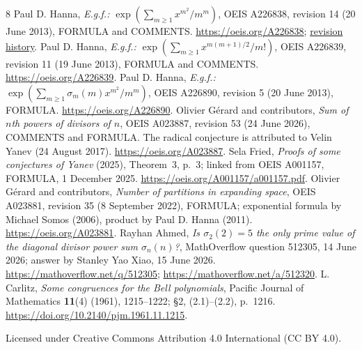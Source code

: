 \documentclass[11pt]{article}
\begin{document}
\begin{thebibliography}{8}\small
{}
Paul D. Hanna, \emph{E.g.f.: $\exp(\sum_{m\geq1}x^{m^2}/m^m)$},
OEIS A226838, revision 14 (20 June 2013), FORMULA and COMMENTS.
\url{https://oeis.org/A226838};
\href{https://oeis.org/history?seq=A226838}{revision history}.
Paul D. Hanna, \emph{E.g.f.: $\exp(\sum_{m\geq1}x^{m(m+1)/2}/m!)$},
OEIS A226839, revision 11 (19 June 2013), FORMULA and COMMENTS.
\url{https://oeis.org/A226839}.
Paul D. Hanna, \emph{E.g.f.: $\exp(\sum_{m\geq1}\sigma_m(m)x^{m^2}/m^m)$},
OEIS A226890, revision 5 (20 June 2013), FORMULA.
\url{https://oeis.org/A226890}.
Olivier G\'erard and contributors, \emph{Sum of $n$th powers of divisors of $n$},
OEIS A023887, revision 53 (24 June 2026), COMMENTS and FORMULA.
The radical conjecture is attributed to Velin Yanev (24 August 2017).
\url{https://oeis.org/A023887}.
Sela Fried, \emph{Proofs of some conjectures of Yanev} (2025),
Theorem~3, p.~3; linked from OEIS A001157, FORMULA, 1 December 2025.
\url{https://oeis.org/A001157/a001157.pdf}.
Olivier G\'erard and contributors, \emph{Number of partitions in expanding space},
OEIS A023881, revision 35 (8 September 2022), FORMULA;
exponential formula by Michael Somos (2006), product by Paul D. Hanna (2011).
\url{https://oeis.org/A023881}.
Rayhan Ahmed, \emph{Is $\sigma_2(2)=5$ the only prime value of the diagonal
divisor power sum $\sigma_n(n)$?}, MathOverflow question 512305,
14 June 2026; answer by Stanley Yao Xiao, 15 June 2026.
\url{https://mathoverflow.net/q/512305}; \url{https://mathoverflow.net/a/512320}.
L. Carlitz, \emph{Some congruences for the Bell polynomials},
Pacific Journal of Mathematics \textbf{11}(4) (1961), 1215--1222;
\S2, (2.1)--(2.2), p.~1216. \url{https://doi.org/10.2140/pjm.1961.11.1215}.
\end{thebibliography}

\noindent\small Licensed under Creative Commons Attribution 4.0 International
(CC BY 4.0).
\end{document}

